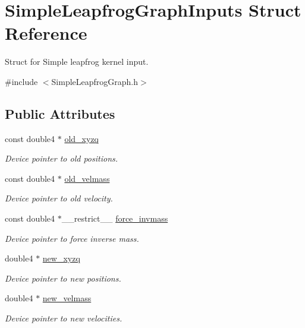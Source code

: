 \hypertarget{structSimpleLeapfrogGraphInputs}{}\section{Simple\+Leapfrog\+Graph\+Inputs Struct Reference}
\label{structSimpleLeapfrogGraphInputs}


Struct for Simple leapfrog kernel input.  




{\ttfamily \#include $<$Simple\+Leapfrog\+Graph.\+h$>$}

\subsection*{Public Attributes}
\begin{DoxyCompactItemize}
\item 
const double4 $\ast$ \hyperlink{structSimpleLeapfrogGraphInputs_a01fc1ca37ad0127b87feb3d757d6f41c}{old\+\_\+xyzq}
\begin{DoxyCompactList}\small\item\em Device pointer to old positions. \end{DoxyCompactList}\item 
const double4 $\ast$ \hyperlink{structSimpleLeapfrogGraphInputs_a0bc70243226e08c936bb36c5dcaa37cc}{old\+\_\+velmass}
\begin{DoxyCompactList}\small\item\em Device pointer to old velocity. \end{DoxyCompactList}\item 
const double4 $\ast$\+\_\+\+\_\+restrict\+\_\+\+\_\+ \hyperlink{structSimpleLeapfrogGraphInputs_a0f2c8a7955eede32a5ae9be6fcf9c894}{force\+\_\+invmass}
\begin{DoxyCompactList}\small\item\em Device pointer to force inverse mass. \end{DoxyCompactList}\item 
double4 $\ast$ \hyperlink{structSimpleLeapfrogGraphInputs_a769f1661c0f9d43ffa98066b106049ab}{new\+\_\+xyzq}
\begin{DoxyCompactList}\small\item\em Device pointer to new positions. \end{DoxyCompactList}\item 
double4 $\ast$ \hyperlink{structSimpleLeapfrogGraphInputs_aaacb07a926ff1a46ac5c8d0edc21d2af}{new\+\_\+velmass}
\begin{DoxyCompactList}\small\item\em Device pointer to new velocities. \end{DoxyCompactList}\item 

\end{DoxyCompactItemize}
